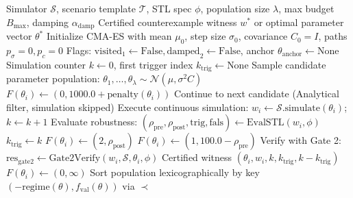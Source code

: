 \documentclass[journal]{IEEEtran}
\begin{document}
\begin{algorithm}[!t]
\footnotesize
\caption{Three-Regime Lexicographic CMA-ES with Covariance Damping and Anchor Re-Centering}
\label{alg:lexicographic_cmaes}
\begin{algorithmic}[1]
\REQUIRE Simulator $\mathcal{S}$, scenario template $\mathcal{T}$, STL spec $\phi$, population size $\lambda$, max budget $B_{\max}$, damping $\alpha_{\text{damp}}$
\ENSURE Certified counterexample witness $w^*$ or optimal parameter vector $\theta^*$
\STATE Initialize CMA-ES with mean $\mu_0$, step size $\sigma_0$, covariance $C_0 = I$, paths $p_\sigma = 0, p_c = 0$
\STATE Flags: $\text{visited}_1 \leftarrow \text{False}, \text{damped}_2 \leftarrow \text{False}$, anchor $\theta_{\text{anchor}} \leftarrow \text{None}$
\STATE Simulation counter $k \leftarrow 0$, first trigger index $k_{\text{trig}} \leftarrow \text{None}$
    \STATE Sample candidate parameter population: $\theta_1, \dots, \theta_\lambda \sim \mathcal{N}(\mu, \sigma^2 C)$
            \STATE $F(\theta_i) \leftarrow (0, 1000.0 + \text{penalty}(\theta_i))$
            \STATE Continue to next candidate (Analytical filter, simulation skipped)
        \ENDIF
        \STATE Execute continuous simulation: $w_i \leftarrow \mathcal{S}.\text{simulate}(\theta_i)$; $k \leftarrow k + 1$
        \STATE Evaluate robustness: $(\rho_{\text{pre}}, \rho_{\text{post}}, \text{trig}, \text{fals}) \leftarrow \text{EvalSTL}(w_i, \phi)$
             \STATE $k_{\text{trig}} \leftarrow k$ \ENDIF
            \STATE $F(\theta_i) \leftarrow (2, \rho_{\text{post}})$ 
        \ELSE
            \STATE $F(\theta_i) \leftarrow (1, 100.0 - \rho_{\text{pre}})$ 
        \ENDIF
            \STATE Verify with Gate 2: $\text{res}_{\text{gate2}} \leftarrow \text{Gate2Verify}(w_i, \mathcal{S}, \theta_i, \phi)$
                \RETURN Certified witness $(\theta_i, w_i, k, k_{\text{trig}}, k - k_{\text{trig}})$
            \ELSE
                \STATE $F(\theta_i) \leftarrow (0, \infty)$ 
            \ENDIF
        \ENDIF
    \ENDFOR
    \STATE Sort population lexicographically by key $(-\mathrm{regime}(\theta), f_{\mathrm{val}}(\theta))$ via $\prec$

\end{algorithmic}
\end{algorithm}
\end{document}
